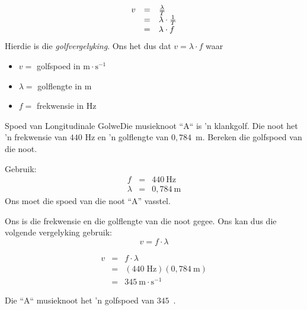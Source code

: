     \begin{equation}
    \begin{array}{ccc}\hfill v& =& \frac{\lambda }{T}\hfill \\ & =& \lambda \ensuremath{\cdot}\frac{1}{T}\hfill \\ & =& \lambda \ensuremath{\cdot}f\hfill \end{array}
      \end{equation}
        \label{m38806*id319870}Hierdie is die \textsl{golfvergelyking}. Ons het dus dat $v=\lambda \ensuremath{\cdot}f$ waar\par 
        \label{m38806*id319901}\begin{itemize}[noitemsep]
            \label{m38806*uid22}\item $v=$ golfspoed in $\text{m}\ensuremath{\cdot}\text{s}{}^{-1}$\label{m38806*uid23}\item $\lambda =$ golflengte in $\text{m}$
\item $f=$ frekwensie in $\text{Hz}$
\end{itemize}
\par

\begin{wex}
{Spoed van Longitudinale Golwe}{Die musieknoot ``A`` is 'n klankgolf. Die noot het 'n frekwensie van $440$ Hz en 'n golflengte van $0,784$~m. Bereken die golfspoed van die noot.}{
Gebruik:
\begin{eqnarray*}
f &=& 440 \ \text{Hz} \\
\lambda &=& 0,784\ \text{m}
\end{eqnarray*}
Ons moet die spoed van die noot ``A'' vasstel.

Ons is die frekwensie en die golflengte van die noot gegee. Ons kan dus die volgende vergelyking gebruik:
\begin{equation*}
v=f\cdot \lambda 
\end{equation*}

\begin{eqnarray*}
v&=&f\cdot \lambda\\
&=&(440\;\text{Hz})(0,784~\text{m})\\
&=&345~\text{m}\cdot\text{s}^{-1}
\end{eqnarray*}

Die ``A`` musieknoot het 'n golfspoed van $345$~\ms.
}
\end{wex}

